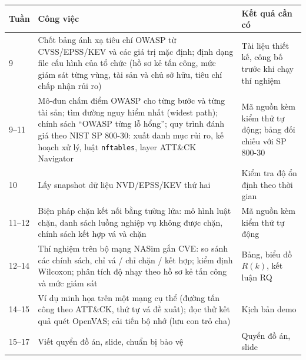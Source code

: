\documentclass[11pt,a4paper]{article}
\begin{document}
\begin{center}
\small
\begin{tabular}{@{}Y{1.6cm}Y{9.4cm}Y{5.0cm}@{}}
\toprule
\textbf{Tuần} & \textbf{Công việc} & \textbf{Kết quả cần có} \\
 & Chốt bảng ánh xạ tiêu chí OWASP từ CVSS/EPSS/KEV và các giá trị mặc định; định dạng file cấu hình của tổ chức (hồ sơ kẻ tấn công, mức giám sát từng vùng, tài sản và chủ sở hữu, tiêu chí chấp nhận rủi ro) & Tài liệu thiết kế, công bố trước khi chạy thí nghiệm \\
9--11 & Mô-đun chấm điểm OWASP cho từng bước và từng tài sản; tìm đường nguy hiểm nhất (widest path); chính sách ``OWASP từng lỗ hổng''; quy trình đánh giá theo NIST SP 800-30: xuất danh mục rủi ro, kế hoạch xử lý, luật \texttt{nftables}, layer ATT\&CK Navigator & Mã nguồn kèm kiểm thử tự động; bảng đối chiếu với SP 800-30 \\
10 & Lấy snapshot dữ liệu NVD/EPSS/KEV thứ hai & Kiểm tra độ ổn định theo thời gian \\
11--12 & Biện pháp chặn kết nối bằng tường lửa: mô hình luật chặn, danh sách luồng nghiệp vụ không được chặn, chính sách kết hợp vá và chặn & Mã nguồn kèm kiểm thử tự động \\
12--14 & Thí nghiệm trên bộ mạng NASim gắn CVE: so sánh các chính sách, chỉ vá / chỉ chặn / kết hợp; kiểm định Wilcoxon; phân tích độ nhạy theo hồ sơ kẻ tấn công và mức giám sát & Bảng, biểu đồ $R(k)$, kết luận RQ \\
14--15 & Ví dụ minh họa trên một mạng cụ thể (đường tấn công theo ATT\&CK, thứ tự vá đề xuất); đọc thử kết quả quét OpenVAS; cải tiến bộ nhớ (lưu con trỏ cha) & Kịch bản demo \\
15--17 & Viết quyển đồ án, slide, chuẩn bị bảo vệ & Quyển đồ án, slide \\
\bottomrule
\end{tabular}
\end{center}
\end{document}
